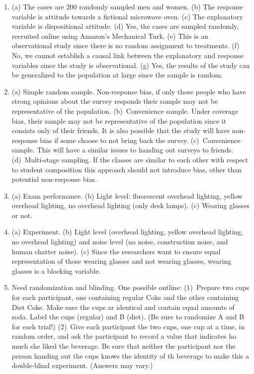 \documentclass[
  10pt,
  openany]{book}
\begin{document}
\begin{enumerate}
  \addtocounter{enumi}{1}
\item
  (a) The cases are 200 randomly sampled men and women. (b) The response variable is attitude towards a fictional microwave oven. (c) The explanatory variable is dispositional attitude. (d) Yes, the cases are sampled randomly, recruited online using Amazon's Mechanical Turk. (e) This is an observational study since there is no random assignment to treatments. (f) No, we cannot establish a causal link between the explanatory and response variables since the study is observational. (g) Yes, the results of the study can be generalized to the population at large since the sample is random.

  \addtocounter{enumi}{1}
\item
  (a) Simple random sample. Non-response bias, if only those people who have strong opinions about the survey responds their sample may not be representative of the population. (b)~Convenience sample. Under coverage bias, their sample may not be representative of the population since it consists only of their friends. It is also possible that the study will have non-response bias if some choose to not bring back the survey. (c)~Convenience sample. This will have a similar issues to handing out surveys to friends. (d)~Multi-stage sampling. If the classes are similar to each other with respect to student composition this approach should not introduce bias, other than potential non-response bias.

  \addtocounter{enumi}{1}
\item
  (a) Exam performance. (b) Light level: fluorescent overhead lighting, yellow overhead lighting, no overhead lighting (only desk lamps). (c) Wearing glasses or not.

  \addtocounter{enumi}{1}
\item
  (a) Experiment. (b) Light level (overhead lighting, yellow overhead lighting, no overhead lighting) and noise level (no noise, construction noise, and human chatter noise). (c) Since the researchers want to ensure equal representation of those wearing glasses and not wearing glasses, wearing glasses is a blocking variable.

  \addtocounter{enumi}{1}
\item
  Need randomization and blinding. One possible outline: (1)~Prepare two cups for each participant, one containing regular Coke and the other containing Diet Coke. Make sure the cups ar identical and contain equal amounts of soda. Label the cups (regular) and B (diet). (Be sure to randomize A and B for each trial!) (2)~Give each participant the two cups, one cup at a time, in random order, and ask the participant to record a value that indicates ho much she liked the beverage. Be sure that neither the participant nor the person handing out the cups knows the identity of th beverage to make this a double-blind experiment. (Answers may vary.)


\end{enumerate}
\end{document}

